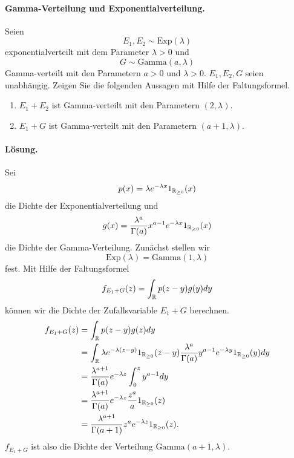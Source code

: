 \paragraph{Gamma-Verteilung und Exponentialverteilung. }
Seien
\begin{equation*}
    E_1, E_2 \sim \text{Exp}(\lambda)
\end{equation*}
exponentialverteilt mit dem Parameter
$\lambda>0$ und
\begin{equation*}
    G \sim \text{Gamma}(a,\lambda)
\end{equation*}
Gamma-verteilt mit den Parametern $a>0$ und $\lambda>0$. $E_1, E_2, G$ seien
unabhängig. Zeigen Sie die folgenden Aussagen mit Hilfe der Faltungsformel.
\begin{enumerate}
    \item $E_1 + E_2$ ist Gamma-verteilt mit den Parametern $(2,\lambda)$. 
    \item $E_1 + G$ ist Gamma-verteilt mit den Parametern $(a+1, \lambda)$. 
\end{enumerate}
\paragraph*{Lösung. }
Sei 
\begin{equation*}
    p(x) = \lambda e^{- \lambda x} 1_{\mathbb R_{\geq 0}}(x)
\end{equation*}
die Dichte der Exponentialverteilung und 
\begin{equation*}
    g(x) = \frac{\lambda^a}{\Gamma(a)} x^{a-1} e^{-\lambda x} 1_{\mathbb R_{\geq 0}}(x)
\end{equation*}
die Dichte der Gamma-Verteilung. Zunächst stellen wir
\begin{equation*}
    \text{Exp}(\lambda) = \text{Gamma}(1, \lambda)
\end{equation*}
fest. Mit Hilfe der Faltungsformel
\begin{equation*}
    f_{E_1 + G}(z) = \int_{\mathbb R}^{} p(z-y) g(y) dy
\end{equation*}
können wir die Dichte der Zufallsvariable $E_1 + G$ berechnen.
\begin{align*}
    f_{E_1 + G} (z) &= \int_{\mathbb R}^{} p(z-y) g(z) dy \\
    &= \int_{\mathbb R}^{} \lambda e^{-\lambda (z-y)} 1_{\mathbb R_{\geq 0}} (z-y)
    \frac{\lambda^a}{\Gamma(a)} y^{a-1} e^{- \lambda y } 1_{\mathbb R_{\geq 0}}(y) dy \\
    &= \frac{\lambda^{a+1}}{\Gamma(a)} e^{-\lambda z} \int_{0}^{z} y^{a-1} dy \\
    &= \frac{\lambda^{a+1}}{\Gamma(a)} e^{-\lambda z} \frac{z^a}{a} 1_{\mathbb R_{\geq 0}} (z) \\
    &=  \frac{\lambda^{a+1}}{\Gamma(a+1)} z^{a} e^{-\lambda z} 1_{\mathbb R_{\geq 0}} (z).
\end{align*}
$f_{E_1 + G}$ ist also die Dichte der Verteilung $\text{Gamma}(a+1, \lambda)$. 



